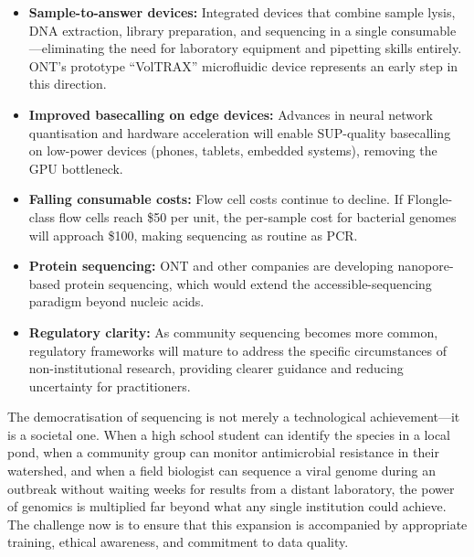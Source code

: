 \begin{itemize}[itemsep=2pt]
  \item \textbf{Sample-to-answer devices:} Integrated devices that combine sample lysis, DNA extraction, library preparation, and sequencing in a single consumable---eliminating the need for laboratory equipment and pipetting skills entirely. \acrshort{ONT}'s prototype ``VolTRAX'' microfluidic device represents an early step in this direction.
  \item \textbf{Improved basecalling on edge devices:} Advances in neural network quantisation and hardware acceleration will enable SUP-quality basecalling on low-power devices (phones, tablets, embedded systems), removing the GPU bottleneck.
  \item \textbf{Falling consumable costs:} Flow cell costs continue to decline. If Flongle-class flow cells reach \$50 per unit, the per-sample cost for bacterial genomes will approach \$100, making sequencing as routine as PCR.
  \item \textbf{Protein sequencing:} \acrshort{ONT} and other companies are developing nanopore-based protein sequencing, which would extend the accessible-sequencing paradigm beyond nucleic acids.
  \item \textbf{Regulatory clarity:} As community sequencing becomes more common, regulatory frameworks will mature to address the specific circumstances of non-institutional research, providing clearer guidance and reducing uncertainty for practitioners.
\end{itemize}

The democratisation of sequencing is not merely a technological achievement---it is a societal one. When a high school student can identify the species in a local pond, when a community group can monitor antimicrobial resistance in their watershed, and when a field biologist can sequence a viral genome during an outbreak without waiting weeks for results from a distant laboratory, the power of genomics is multiplied far beyond what any single institution could achieve. The challenge now is to ensure that this expansion is accompanied by appropriate training, ethical awareness, and commitment to data quality.

